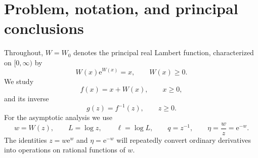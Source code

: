 \documentclass[11pt]{article}
\theoremstyle{clean}
\newcommand{\rLambert}{\mathcal W}
\newcommand{\e}{\mathrm e}
\begin{document}
\begin{abstract}
We determine the inverse of \(f(x)=x+W(x)\) on the nonnegative real axis and
construct its complete asymptotic description at infinity.  An elementary
change of variable reduces the inverse exactly to the \(r\)-Lambert function:
if \(\rLambert_r\) denotes the inverse of \(u\e^u+ru\), then
\(f^{-1}(z)=z-\rLambert_1(z)\).  Relative to the ordinary Lambert value
\(w=W(z)\), the difference is governed by the exponentially small parameter
\(\eta=w/z=\e^{-w}\).  We obtain a convergent local expansion in \(\eta\), a
uniform fixed-order remainder estimate, and an explicit differential-operator
formula for every coefficient.  The first coefficients are rational functions
of \(w\), beginning with
\[
 \frac{w^2}{1+w},\qquad
 \frac{w^3(w^2-2)}{2(1+w)^3},\qquad
 \frac{w^4(2w-1)(w^3-6w-6)}{6(1+w)^5}.
\]
Combining these sectors with the classical logarithmic expansion of \(W(z)\)
produces a nested transseries in \(z^{-1}\), \(\log z\), and
\(\log\log z\).  We then formulate a general reversal calculus for maps
\(F(z)=z+\Phi(z)\) whose perturbation is a logarithmic transseries.  In the
filtered differential algebra with \(q=z^{-1}\) and
\(\delta=z\,\mathrm d/\mathrm dz\), the identity
\(
\mathrm D(q^m a)=q^{m+1}(\delta-m)a
\)
turns Lagrange--B\"urmann inversion into a triangular, finitely computable
algorithm.  Fixed-point iteration, Newton iteration, truncation rules, and
residual certificates are developed in parallel.  The result is both an
explicit solution of the stated inverse problem and a reusable method for
series reversal across a broad class of polynomial-logarithmic transseries.
\end{abstract}

\tableofcontents
\clearpage
{}

\section{Problem, notation, and principal conclusions}

Throughout, \(W=W_0\) denotes the principal real Lambert function, characterized
on \([0,\infty)\) by \cite{Corless1996,DLMF}
\begin{equation}\label{eq:Wdef}
  W(x)\e^{W(x)}=x,\qquad W(x)\ge 0.
\end{equation}
We study
\begin{equation}\label{eq:fdef}
  f(x)=x+W(x),\qquad x\ge 0,
\end{equation}
and its inverse
\[
  g(z)=f^{-1}(z),\qquad z\ge 0.
\]
For the asymptotic analysis we use
\begin{equation}\label{eq:notation}
  w=W(z),\qquad L=\log z,
  \qquad \ell=\log L,
  \qquad q=z^{-1},
  \qquad \eta=\frac{w}{z}=\e^{-w}.
\end{equation}
The identities \(z=w\e^w\) and \(\eta=\e^{-w}\) will repeatedly convert
ordinary derivatives into operations on rational functions of \(w\).
\end{document}
